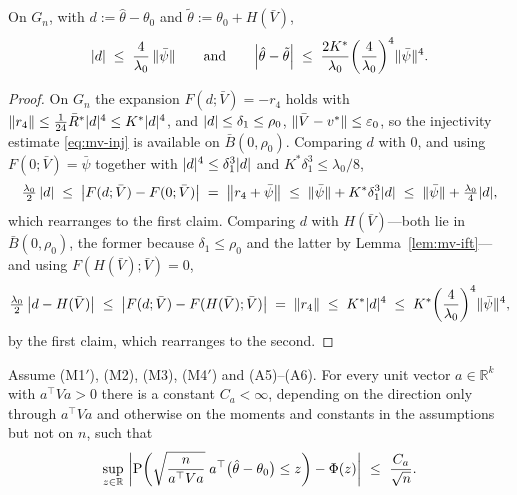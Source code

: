 \begin{lemma}\label{lem:mv-defect}
On $G_{n}$, with $d:=\hat\theta-\theta_{0}$ and $\tilde\theta:=\theta_{0}+H(\bar V)$,
\[
\abs{d}\;\le\;\frac{4}{\lambda_{0}}\,\norm{\bar\psi}
\qquad\text{and}\qquad
\abs*{\hat\theta-\tilde\theta}\;\le\;\frac{2K^{*}}{\lambda_{0}}\paren*{\frac{4}{\lambda_{0}}}^{4}\norm{\bar\psi}^{4} .
\]
\end{lemma}

\begin{proof}
On $G_{n}$ the expansion $F(d;\bar V)=-r_{4}$ holds with $\norm{r_{4}}\le\tfrac1{24}\bar R^{*}\abs{d}^{4}\le K^{*}\abs{d}^{4}$, and $\abs{d}\le\delta_{1}\le\rho_{0}$, $\norm{\bar V-v^{*}}\le\eps_{0}$, so the injectivity estimate \eqref{eq:mv-inj} is available on $\bar B(0,\rho_{0})$. Comparing $d$ with $0$, and using $F(0;\bar V)=\bar\psi$ together with $\abs{d}^{4}\le\delta_{1}^{3}\abs{d}$ and $K^{*}\delta_{1}^{3}\le\lambda_{0}/8$,
\[
\tfrac{\lambda_{0}}{2}\,\abs{d}\;\le\;\abs*{F(d;\bar V)-F(0;\bar V)}\;=\;\norm*{r_{4}+\bar\psi}\;\le\;\norm{\bar\psi}+K^{*}\delta_{1}^{3}\abs{d}\;\le\;\norm{\bar\psi}+\tfrac{\lambda_{0}}{4}\abs{d},
\]
which rearranges to the first claim. Comparing $d$ with $H(\bar V)$---both lie in $\bar B(0,\rho_{0})$, the former because $\delta_{1}\le\rho_{0}$ and the latter by Lemma~\ref{lem:mv-ift}---and using $F(H(\bar V);\bar V)=0$,
\[
\tfrac{\lambda_{0}}{2}\,\abs*{d-H(\bar V)}\;\le\;\abs*{F(d;\bar V)-F(H(\bar V);\bar V)}\;=\;\norm{r_{4}}\;\le\;K^{*}\abs{d}^{4}\;\le\;K^{*}\paren*{\frac{4}{\lambda_{0}}}^{4}\norm{\bar\psi}^{4},
\]
by the first claim, which rearranges to the second.
\end{proof}

\begin{theorem}\label{thm:mv-be}
Assume (M1$'$), (M2), (M3), (M4$'$) and (A5)--(A6). For every unit vector $a\in\mathbb{R}^{k}$ with $a^{\top}Va>0$ there is a constant $C_{a}<\infty$, depending on the direction only through $a^{\top}Va$ and otherwise on the moments and constants in the assumptions but not on $n$, such that
\[
\sup_{z\in\mathbb{R}}\ \abs*{\Prob\paren*{\sqrt{\frac{n}{a^{\top}Va}}\;a^{\top}\big(\hat\theta-\theta_{0}\big)\le z}-\Phi(z)}\ \le\ \frac{C_{a}}{\sqrt{n}} .
\]
\end{theorem}

